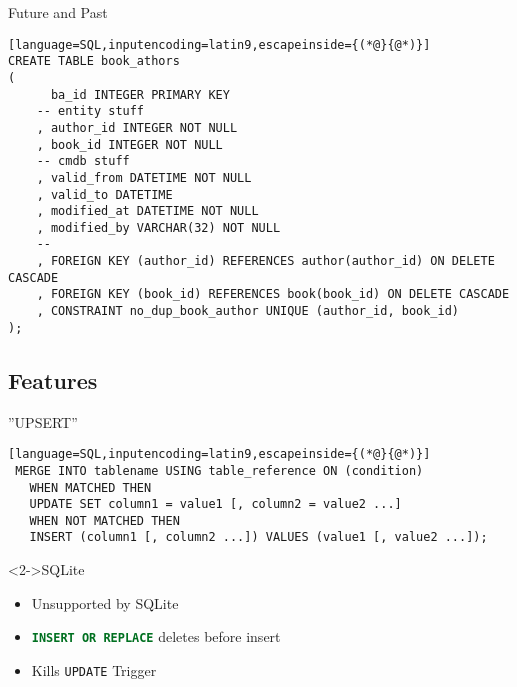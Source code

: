 \documentclass[ngerman,xcolor={table,dvipsnames},smaller,compress,hyperref={bookmarks,colorlinks}]{beamer}%
\begin{document}
\begin{frame}[fragile]{}
\begin{block}{Future and Past}
\scriptsize
\begin{lstlisting}[language=SQL,inputencoding=latin9,escapeinside={(*@}{@*)}]
CREATE TABLE book_athors
(
      ba_id INTEGER PRIMARY KEY
    -- entity stuff
    , author_id INTEGER NOT NULL
    , book_id INTEGER NOT NULL
    -- cmdb stuff
    , valid_from DATETIME NOT NULL
    , valid_to DATETIME
    , modified_at DATETIME NOT NULL
    , modified_by VARCHAR(32) NOT NULL
    -- 
    , FOREIGN KEY (author_id) REFERENCES author(author_id) ON DELETE CASCADE
    , FOREIGN KEY (book_id) REFERENCES book(book_id) ON DELETE CASCADE
    , CONSTRAINT no_dup_book_author UNIQUE (author_id, book_id)
);
\end{lstlisting}
\end{block}
\end{frame}

\subsection{Features}

\begin{frame}[fragile]{}
\begin{block}{''UPSERT''}
\scriptsize
\begin{lstlisting}[language=SQL,inputencoding=latin9,escapeinside={(*@}{@*)}]
 MERGE INTO tablename USING table_reference ON (condition)
   WHEN MATCHED THEN
   UPDATE SET column1 = value1 [, column2 = value2 ...]
   WHEN NOT MATCHED THEN
   INSERT (column1 [, column2 ...]) VALUES (value1 [, value2 ...]);
\end{lstlisting}
\end{block}

\begin{block}<2->{SQLite}
\begin{itemize}
\item<2-> Unsupported by SQLite
\item<3-> \lstinline[language=SQL,inputencoding=latin9]!INSERT OR REPLACE! deletes before insert
\item[$\rightarrow$]<4-> Kills \texttt{UPDATE} Trigger
\end{itemize}
\end{block}
\end{frame}
\end{document}
